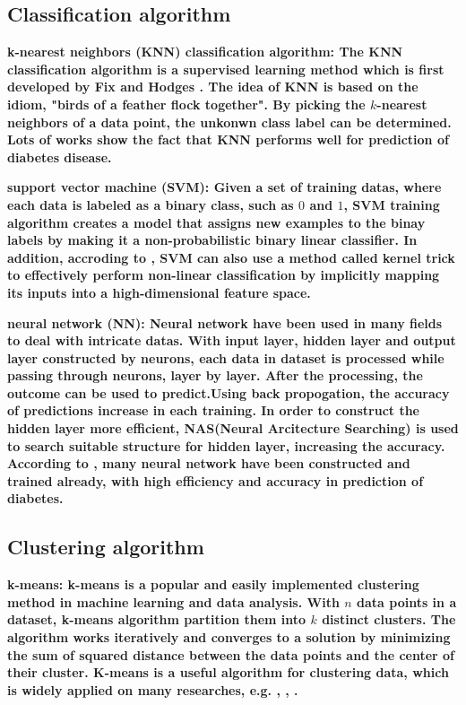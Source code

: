 \documentclass[twocolumn,10pt]{article}
\begin{document}
\subsection*{Classification algorithm}

\bf{k-nearest neighbors (KNN) classification algorithm}: \rm{The} KNN classification algorithm is a supervised learning 
method which is first developed by Fix and Hodges \cite{10.2307/1403797}. The idea of KNN is based on the idiom, 
"birds of a feather flock together". By picking the $k$-nearest neighbors of a data point, the unkonwn class label 
can be determined. Lots of works \cite{6528591} \cite{8276012} \cite{vijayan2014study} show the fact that KNN performs  
well for prediction of diabetes disease.

\bf{support vector machine (SVM)}: \rm{Given} a set of training datas, where each data is labeled as a binary class, such as 
$0$ and $1$, SVM training algorithm creates a model that assigns new examples to the binay labels by making it a non-probabilistic 
binary linear classifier. In addition, accroding to \cite{amari1999improving} \cite{hofmann2006support}, SVM can also use a 
method called kernel trick to effectively perform non-linear classification by implicitly mapping its inputs into a high-dimensional 
feature space.

\bf{neural network (NN)}: \rm{Neural} network have been used in many fields to deal with intricate datas. With input layer, hidden 
layer and output layer constructed by neurons, each data in dataset is processed while passing through neurons, layer by layer. 
After the processing, the outcome can be used to predict.Using back propogation, the accuracy of predictions increase in each 
training. In order to construct the hidden layer more efficient, NAS(Neural Arcitecture Searching) is used to search suitable 
structure for hidden layer, increasing the accuracy. According to \cite{Gadekallu2020}\cite{Beghriche2021}, many neural network 
have been constructed and trained already, with high efficiency and accuracy in prediction of diabetes.

\subsection*{Clustering algorithm}

\bf{k-means}: \rm{k-means} is a popular and easily implemented clustering method in machine learning and data analysis. With $n$
data points in a dataset, k-means algorithm partition them into $k$ distinct clusters. The algorithm works iteratively and 
converges to a solution by minimizing the sum of squared distance between the data points and the center of their cluster. 
K-means is a useful algorithm for clustering data, which is widely applied on many researches, e.g. \cite{oyelade2010application}, 
\cite{NIDHEESH2017213}, \cite{kadhm2018accurate}.
\end{document}
